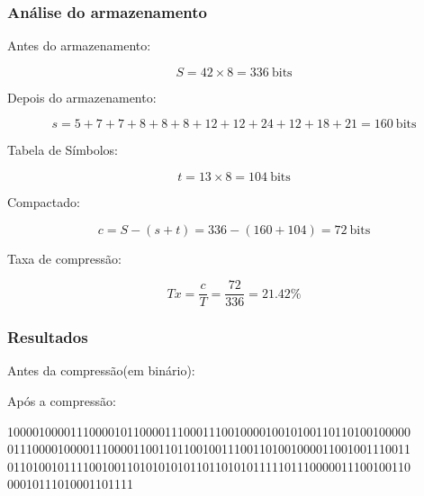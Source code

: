 \documentclass[10pt]{beamer}
\begin{document}
\begin{frame}[t]
    \frametitle{Análise do armazenamento}
    Antes do armazenamento:

    $$S = 42\times 8 = 336\ \text{bits}$$

    \pause Depois do armazenamento:

    $$s=5+7+7+8+8+8+12+12+24+12+18+21 = 160\ \text{bits}$$

    \pause Tabela de Símbolos:

    $$t = 13\times 8 = 104\ \text{bits}$$
    
    \pause Compactado:

    $$c = S-(s+t) = 336-(160+104) = 72\ \text{bits}$$

    \pause Taxa de compressão:

    $$Tx = \frac{c}{T} = \frac{72}{336}=21.42\%$$


\end{frame}

\begin{frame}[t]
    \frametitle{Resultados}


    Antes da compressão(em binário):\vfill

    
    
    

    
    \vfill

    Após a compressão:\vfill

    1000010000111000010110000111000111001000010010100110110100100000
    0111000010000111000011001101100100111001101001000011001001110011
    0110100101111001001101010101011011010101111101110000011100100110
    00010111010001101111

\end{frame}
\end{document}
